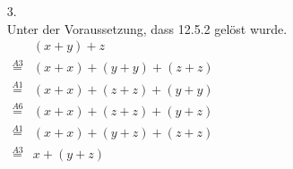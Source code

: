\documentclass[a4paper,11pt,fleqn]{scrartcl}
\begin{document}
\begin{enumerate}
\begin{enumerate}
			\item[3.] \quad \\
			Unter der Voraussetzung, dass 12.5.2 gelöst wurde. \\
			\(
			\begin{array}{cl}
				& (x + y) + z  \\
				\overset{A3}{=} & (x + x) + (y + y) + (z + z) \\
				\overset{A1}{=} & (x + x) + (z + z) + (y + y) \\
				\overset{A6}{=} & (x + x) + (z + z) + (y + z) \\
				\overset{A1}{=} & (x + x) + (y + z) + (z + z) \\
				\overset{A3}{=} & x + (y + z) \\
			\end{array}
			\)

		\end{enumerate}
	\end{enumerate}
\end{document}
